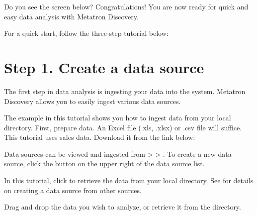 \documentclass[letterpaper,10pt,english]{sphinxmanual}
\begin{document}
Do you see the screen below? Congratulations! You are now ready for quick and easy data analysis with Metatron Discovery.
\begin{quote}

\begin{figure}[H]
\centering

\noindent{}
\end{figure}
\end{quote}

For a quick start, follow the three-step tutorial below:


\section{Step 1. Create a data source}
\label{\detokenize{discovery/part00/step1:step1}}\label{\detokenize{discovery/part00/step1::doc}}
The first step in data analysis is ingesting your data into the system. Metatron Discovery allows you to easily ingest various data sources.

The example in this tutorial shows you how to ingest data from your local directory. First, prepare data. An Excel file (.xls, .xlsx) or .csv file will suffice. This tutorial uses sales data. Download it from the link below:
\begin{quote}

\end{quote}

Data sources can be viewed and ingested from  \textgreater{}  \textgreater{} . To create a new data source, click the  button on the upper right of the data source list.
\begin{quote}

\begin{figure}[H]
\centering

\noindent{}
\end{figure}
\end{quote}

In this tutorial, click  to retrieve the data from your local directory. See {\hyperref[\detokenize{discovery/part02/create_a_data_source::doc}]{}} for details on creating a data source from other sources.

Drag and drop the data you wish to analyze, or retrieve it from the directory.
\begin{quote}

\begin{figure}[H]
\centering

\noindent{}
\end{figure}
\end{quote}
\end{document}
